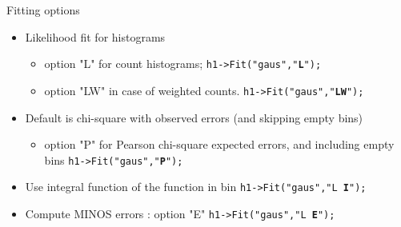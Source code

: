 \documentclass[aspectratio=169]{beamer}
\newcommand{\myterminalinline}[1]{
    \colorbox{terminal-bg}{{\color{terminal-fg}\texttt{#1}}}
}
\newcommand{\emphinlisting}[1]{{\color{terminal-fg-emph}\textbf{#1}}}
\newcommand{\emphlightinlisting}[1]{{\color{terminal-fg-emph}#1}}
\begin{document}
\begin{frame}[fragile]{Fitting options}
\begin{itemize}
    \item{Likelihood ﬁt for histograms}
    \begin{itemize}
        \item{option "L" for count histograms; \myterminalinline{h1->Fit("gaus","\emphinlisting{L}");}}
        \item{option "LW" in case of weighted counts. \myterminalinline{h1->Fit("gaus","\emphinlisting{LW}");}}
    \end{itemize}
    \item{Default is chi-square with observed errors (and skipping empty bins)}
    \begin{itemize}
        \item{option "P" for Pearson chi-square expected errors, and including empty bins \myterminalinline{h1->Fit("gaus","\emphinlisting{P}");}}
    \end{itemize}
\item{Use integral function of the function in bin \myterminalinline{h1->Fit("gaus","\emphlightinlisting{L} \emphinlisting{I}");}}
\item{Compute MINOS errors : option "E" \myterminalinline{h1->Fit("gaus","\emphlightinlisting{L} \emphinlisting{E}");}}
\end{itemize}
\end{frame}
\end{document}

